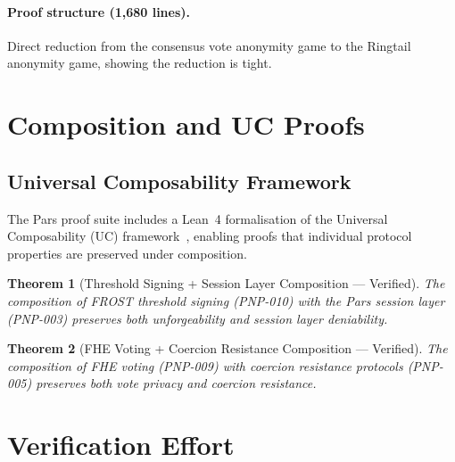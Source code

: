 \documentclass[11pt,a4paper]{article}
\newtheorem{theorem}{Theorem}[section]
\begin{document}
\paragraph{Proof structure (1{,}680 lines).}
Direct reduction from the consensus vote anonymity game to the
Ringtail anonymity game, showing the reduction is tight.

\section{Composition and UC Proofs}
\label{sec:composition}

\subsection{Universal Composability Framework}

The Pars proof suite includes a Lean~4 formalisation of the Universal
Composability (UC) framework~\cite{canetti2001uc}, enabling proofs that
individual protocol properties are preserved under composition.

\begin{theorem}[Threshold Signing + Session Layer Composition --- Verified]
    The composition of FROST threshold signing (PNP-010) with the Pars
    session layer (PNP-003) preserves both unforgeability and session
    layer deniability.
\end{theorem}

\begin{theorem}[FHE Voting + Coercion Resistance Composition --- Verified]
    The composition of FHE voting (PNP-009) with coercion resistance
    protocols (PNP-005) preserves both vote privacy and coercion
    resistance.
\end{theorem}

\section{Verification Effort}
\label{sec:effort}
\end{document}
